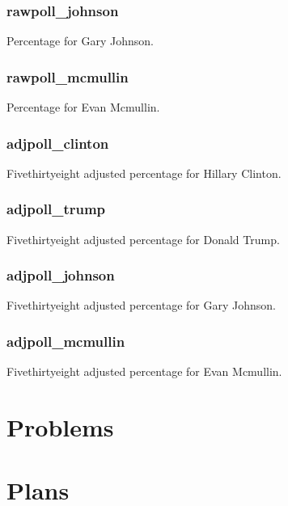 \documentclass[12pt]{article}
\begin{document}
	\subsubsection{rawpoll\_johnson}
	Percentage for Gary Johnson.
	\subsubsection{rawpoll\_mcmullin}
	Percentage for Evan Mcmullin.
	\subsubsection{adjpoll\_clinton}
	Fivethirtyeight adjusted percentage for Hillary Clinton.
	\subsubsection{adjpoll\_trump}
	Fivethirtyeight adjusted percentage for Donald Trump.
	\subsubsection{adjpoll\_johnson}
	Fivethirtyeight adjusted percentage for Gary Johnson.
	\subsubsection{adjpoll\_mcmullin}
	Fivethirtyeight adjusted percentage for Evan Mcmullin.
	\section{\textbf{Problems}}
	\section{\textbf{Plans}}
	
	
\end{document}
